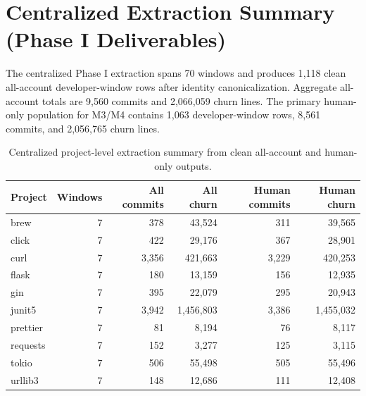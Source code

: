 \section{Centralized Extraction Summary (Phase I Deliverables)}
\label{sec:round1_summary}

The centralized Phase I extraction spans 70 windows and produces 1{,}118 clean all-account developer-window rows after identity
canonicalization. Aggregate all-account totals are 9{,}560 commits and 2{,}066{,}059 churn lines. The primary human-only
population for M3/M4 contains 1{,}063 developer-window rows, 8{,}561 commits, and 2{,}056{,}765 churn lines.

\begin{table}[H]
\centering
\scriptsize
\renewcommand{\arraystretch}{1.12}
\begin{tabular}{lrrrrr}
\toprule
\textbf{Project} & \textbf{Windows} & \textbf{All commits} & \textbf{All churn} & \textbf{Human commits} & \textbf{Human churn} \\
\midrule
brew     & 7 & 378   & 43{,}524    & 311   & 39{,}565 \\
click    & 7 & 422   & 29{,}176    & 367   & 28{,}901 \\
curl     & 7 & 3{,}356 & 421{,}663 & 3{,}229 & 420{,}253 \\
flask    & 7 & 180   & 13{,}159    & 156   & 12{,}935 \\
gin      & 7 & 395   & 22{,}079    & 295   & 20{,}943 \\
junit5   & 7 & 3{,}942 & 1{,}456{,}803 & 3{,}386 & 1{,}455{,}032 \\
prettier & 7 & 81    & 8{,}194     & 76    & 8{,}117 \\
requests & 7 & 152   & 3{,}277     & 125   & 3{,}115 \\
tokio    & 7 & 506   & 55{,}498    & 505   & 55{,}496 \\
urllib3  & 7 & 148   & 12{,}686    & 111   & 12{,}408 \\
\bottomrule
\end{tabular}
\caption{Centralized project-level extraction summary from clean all-account and human-only outputs.}
\label{tab:round1_commit_churn_summary}
\end{table}

\begin{table}[H]
\centering
\renewcommand{\arraystretch}{1.15}
\caption{Centralized global extraction totals from all-account, human-only, and bot-only populations.}
\label{tab:round1_global_totals}
\end{table}

